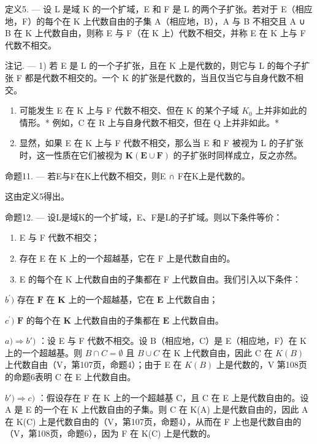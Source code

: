 定义5. --- 设 L 是域 K 的一个扩域，E 和 F 是 L 的两个子扩张。若对于 E（相应地，F）的每个在 K 上代数自由的子集 A（相应地，B），A 与 B 不相交且 A ∪ B 在 K 上代数自由，则称 E 与 F（在 K 上）代数不相交，并称 E 在 K 上与 F 代数不相交。

注记. --- 1) 若 E 是 L 的一个子扩张，且在 K 上是代数的，则它与 L 的每个子扩张 F 都是代数不相交的。一个 K 的扩张是代数的，当且仅当它与自身代数不相交。

\begin{enumerate}
\def\labelenumi{\arabic{enumi})}
\setcounter{enumi}{1}
\item
  可能发生 E 在 K 上与 F 代数不相交、但在 K 的某个子域 \(K_{0}\) 上并非如此的情形。* 例如，C 在 R 上与自身代数不相交，但在 Q 上并非如此。*
\item
  显然，如果 E 在 K 上与 F 代数不相交，那么当 E 和 F 被视为 L 的子扩张时，这一性质在它们被视为 \(\mathbf{K}(\mathbf{E} \cup \mathbf{F})\) 的子扩张时同样成立，反之亦然。
\end{enumerate}

命题11. --- 若E与F在K上代数不相交，则E ∩ F在K上是代数的。

这由定义5得出。

命题12. --- 设L是域K的一个扩域，E、F是L的子扩域。则以下条件等价：

\begin{enumerate}
\def\labelenumi{\alph{enumi})}
\item
  E 与 F 代数不相交；
\item
  存在 E 在 K 上的一个超越基，它在 F 上是代数自由的。
\item
  E 的每个在 K 上代数自由的子集都在 F 上代数自由。我们引入以下条件：
\end{enumerate}

\(b^{\prime})\) 存在 \(\mathbf{F}\) 在 \(\mathbf{K}\) 上的一个超越基，它在 \(\mathbf{E}\) 上代数自由；

\(c^{\prime})\) \(\mathbf{F}\) 的每个在 \(\mathbf{K}\) 上代数自由的子集都在 \(\mathbf{E}\) 上代数自由。

\(a) \Rightarrow b')\) ：设 E 与 F 代数不相交。设 B（相应地，C）是 E（相应地，F）在 K 上的一个超越基。则 \(B \cap C = \emptyset\) 且 \(B \cup C\) 在 K 上代数自由，因此 C 在 \(K(B)\) 上代数自由（V，第107页，命题4）；由于 E 在 \(K(B)\) 上是代数的，V 第108页的命题6表明 C 在 E 上代数自由。

\(b') \Rightarrow c)\) ：假设存在 F 在 K 上的一个超越基 C，且 C 在 E 上是代数自由的。设 A 是 E 的一个在 K 上代数自由的子集。则 C 在 K(A) 上是代数自由的，因此 A 在 K(C) 上是代数自由的（V，第107页，命题4），从而在 F 上也是代数自由的（V，第108页，命题6），因为 F 在 K(C) 上是代数的。

